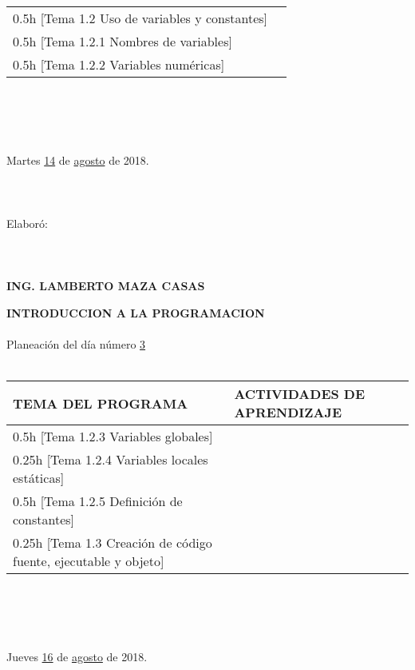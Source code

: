 \documentclass[landscape]{article}
\begin{document}
{\begin{center}
\begin{tabular}{|p{11cm}|p{8cm}|}
	0.5h	[Tema 1.2 Uso de variables y constantes]
&\\
	0.5h	[Tema 1.2.1 Nombres de variables]
&\\
	0.5h	[Tema 1.2.2 Variables num\'ericas]
&\\
\hline
\end{tabular}
\ \\
\ \\
\ \\
\ \\
Martes \underline{\hspace{0.5cm}14\hspace{0.5cm}} de  \underline{\hspace{0.5cm}agosto\hspace{0.5cm}} de 2018.
\ \\
\ \\
\ \\
\ \\
Elabor\'o:
\ \\
\ \\
\ \\
\ \\
{\bf ING. LAMBERTO MAZA CASAS}
\end{center}
\eject
\begin{center}
{\bf 
INTRODUCCION A LA PROGRAMACION
}
\ \\
\ \\
Planeaci\'on del d\'ia n\'umero \underline{\hspace{0.5cm}3\hspace{0.5cm}}
\ \\
\ \\
\begin{tabular}{|p{11cm}|p{8cm}|}\hline
{\bf TEMA DEL PROGRAMA}&{\bf ACTIVIDADES DE APRENDIZAJE}\\\hline
	0.5h	[Tema 1.2.3 Variables globales]
&\\
	0.25h	[Tema 1.2.4 Variables locales est\'aticas]
&\\
	0.5h	[Tema 1.2.5 Definici\'on de constantes]
&\\
	0.25h	[Tema 1.3 Creaci\'on de c\'odigo fuente, ejecutable y objeto]
&\\
\hline
\end{tabular}
\ \\
\ \\
\ \\
\ \\
Jueves \underline{\hspace{0.5cm}16\hspace{0.5cm}} de  \underline{\hspace{0.5cm}agosto\hspace{0.5cm}} de 2018.

\end{center}}
\end{document}
